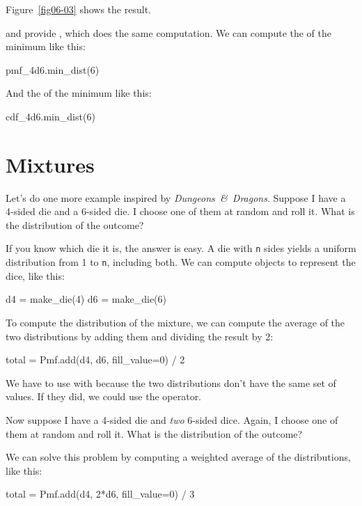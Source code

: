 \documentclass[12pt]{book}
\theoremstyle{exercise}
\begin{document}
Figure~\ref{fig06-03} shows the result.

 and  provide , which does the same computation.
We can compute the  of the minimum like this:

\begin{code}
pmf_4d6.min_dist(6)
\end{code}

And the  of the minimum like this:

\begin{code}
cdf_4d6.min_dist(6)
\end{code}


\section{Mixtures}
\label{mixture}

Let's do one more example inspired by {\it Dungeons~\&~Dragons}.
Suppose I have a 4-sided die and a 6-sided die.
I choose one of them at random and roll it.
What is the distribution of the outcome?

If you know which die it is, the answer is easy.
A die with {\tt n} sides yields a uniform distribution from 1 to {\tt n}, including both.
We can compute  objects to represent the dice, like this:

\begin{code}
d4 = make_die(4)
d6 = make_die(6)
\end{code}

To compute the distribution of the mixture, we can compute the average of the two distributions by adding them and dividing the result by 2:

\begin{code}
total = Pmf.add(d4, d6, fill_value=0) / 2
\end{code}

We have to use  with  because the two distributions don't have the same set of values.
If they did, we could use the \py{+} operator.

Now suppose I have a 4-sided die and {\it two} 6-sided dice.
Again, I choose one of them at random and roll it.
What is the distribution of the outcome?

We can solve this problem by computing a weighted average of the distributions, like this:

\begin{code}
total = Pmf.add(d4, 2*d6, fill_value=0) / 3
\end{code}
\end{document}
